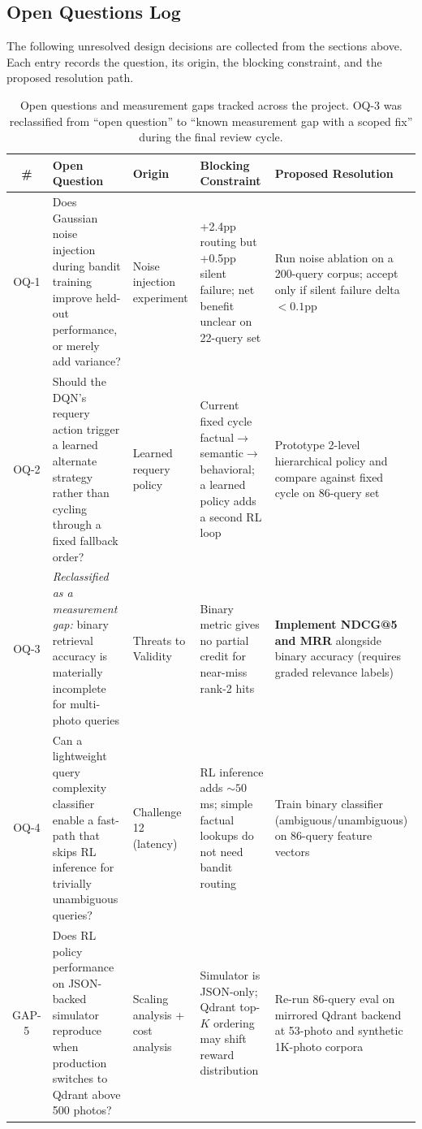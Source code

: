 \documentclass[11pt,letterpaper]{article}
\begin{document}
\subsection{Open Questions Log}

The following unresolved design decisions are collected from the sections above. Each entry records the question, its origin, the blocking constraint, and the proposed resolution path.

\begin{table}[H]
\centering
\small
\begin{tabularx}{\textwidth}{c p{4cm} p{2.5cm} p{2.5cm} p{3.5cm}}
\toprule
\textbf{\#} & \textbf{Open Question} & \textbf{Origin} & \textbf{Blocking Constraint} & \textbf{Proposed Resolution} \\
\midrule
OQ-1 & Does Gaussian noise injection during bandit training improve held-out performance, or merely add variance? & Noise injection experiment & +2.4pp routing but +0.5pp silent failure; net benefit unclear on 22-query set & Run noise ablation on a 200-query corpus; accept only if silent failure delta $< 0.1$pp \\
\addlinespace
OQ-2 & Should the DQN's requery action trigger a learned alternate strategy rather than cycling through a fixed fallback order? & Learned requery policy & Current fixed cycle factual$\to$semantic$\to$behavioral; a learned policy adds a second RL loop & Prototype 2-level hierarchical policy and compare against fixed cycle on 86-query set \\
\addlinespace
OQ-3 & \textit{Reclassified as a measurement gap:} binary retrieval accuracy is materially incomplete for multi-photo queries & Threats to Validity & Binary metric gives no partial credit for near-miss rank-2 hits & \textbf{Implement NDCG@5 and MRR} alongside binary accuracy (requires graded relevance labels) \\
\addlinespace
OQ-4 & Can a lightweight query complexity classifier enable a fast-path that skips RL inference for trivially unambiguous queries? & Challenge 12 (latency) & RL inference adds ${\sim}50$ms; simple factual lookups do not need bandit routing & Train binary classifier (ambiguous/unambiguous) on 86-query feature vectors \\
\addlinespace
GAP-5 & Does RL policy performance on JSON-backed simulator reproduce when production switches to Qdrant above 500 photos? & Scaling analysis + cost analysis & Simulator is JSON-only; Qdrant top-$K$ ordering may shift reward distribution & Re-run 86-query eval on mirrored Qdrant backend at 53-photo and synthetic 1K-photo corpora \\
\bottomrule
\end{tabularx}
\caption{Open questions and measurement gaps tracked across the project. OQ-3 was reclassified from ``open question'' to ``known measurement gap with a scoped fix'' during the final review cycle.}
\label{tab:open-questions}
\end{table}
\end{document}

